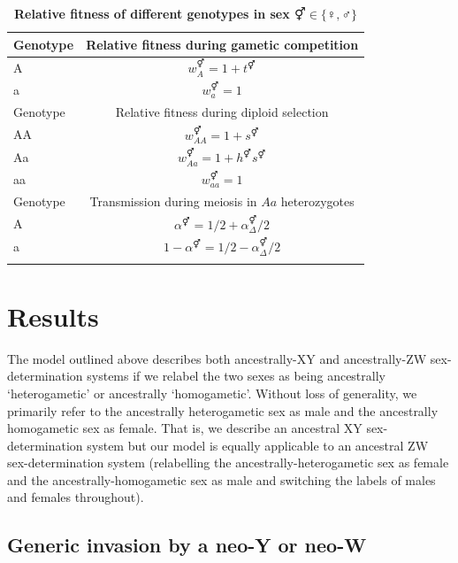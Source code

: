 \documentclass[10pt,letterpaper]{article}
\begin{document}
\begin{table}[ht]
\smallskip
\caption{{\bf Relative fitness of different genotypes in sex $\Hermaphrodite \in \{\female,\male\}$ } }
\begin{tabular}{l c }
\hline\hline
  Genotype & Relative fitness during gametic competition \\ [0.5ex] \hline
  A & $w_{A}^\Hermaphrodite = 1+t^\Hermaphrodite$ \\
  a & $w_{a}^\Hermaphrodite = 1$ \\ [0.5ex] \hline
  Genotype & Relative fitness during diploid selection \\ [0.5ex] \hline
  AA & $w_{AA}^\Hermaphrodite = 1+ s^\Hermaphrodite$ \\
  Aa & $w_{Aa}^\Hermaphrodite = 1+h^\Hermaphrodite s^\Hermaphrodite$ \\
  aa & $w_{aa}^\Hermaphrodite = 1$ \\ [0.5ex] \hline
  Genotype & Transmission during meiosis in $Aa$ heterozygotes \\ [0.5ex] \hline
  A & $\alpha^\Hermaphrodite=1/2+\alpha_{\Delta}^{\Hermaphrodite}/2$ \\
  a & $1-\alpha^\Hermaphrodite=1/2-\alpha_{\Delta}^{\Hermaphrodite}/2$ \\
  \hline \hline
  \label{tab:fitnesstable}
 \end{tabular}
\end{table}

\section*{Results}

The model outlined above describes both ancestrally-XY and ancestrally-ZW sex-determination systems if we relabel the two sexes as being ancestrally `heterogametic' or ancestrally `homogametic'. 
Without loss of generality, we primarily refer to the ancestrally heterogametic sex as male and the ancestrally homogametic sex as female.
That is, we describe an ancestral XY sex-determination system but our model is equally applicable to an ancestral ZW sex-determination system (relabelling the ancestrally-heterogametic sex as female and the ancestrally-homogametic sex as male and switching the labels of males and females throughout). 

\subsection*{Generic invasion by a neo-Y or neo-W}
\end{document}

